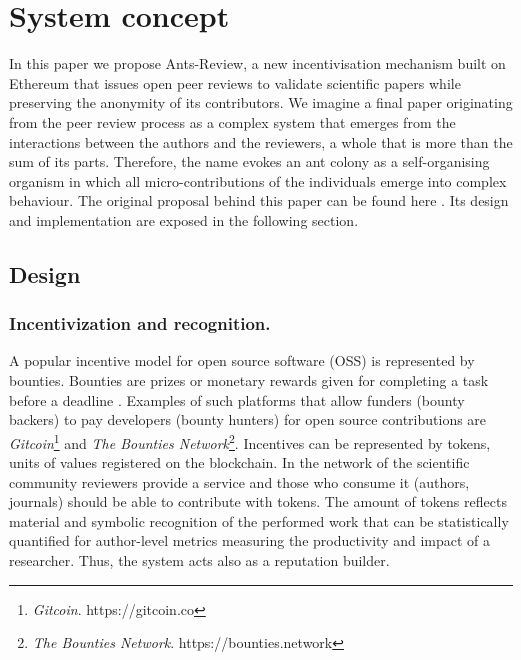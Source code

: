 \documentclass[runningheads]{llncs}
\begin{document}
\section{System concept}
In this paper we propose Ants-Review, a new incentivisation mechanism built on Ethereum that issues open peer reviews to validate scientific papers while preserving the anonymity of its contributors. We imagine a final paper originating from the peer review process as a complex system that emerges from the interactions between the authors and the reviewers, a whole that is more than the sum of its parts. Therefore, the name evokes an ant colony as a self-organising organism in which all micro-contributions of the individuals emerge into complex behaviour. The original proposal behind this paper can be found here \cite{AntsReview}. Its design and implementation are exposed in the following section.

\subsection{Design}

\subsubsection{Incentivization and recognition.} A popular incentive model for open source software (OSS) is represented by bounties. Bounties are prizes or monetary rewards given for completing a task before a deadline \cite{BountyGit}. Examples of such platforms that allow funders (bounty backers) to pay developers (bounty hunters) for open source contributions are \emph{Gitcoin}\footnote[2]{\emph{Gitcoin}. https://gitcoin.co} and \emph{The Bounties Network}\footnote[3]{\emph{The Bounties Network}. https://bounties.network}. Incentives can be represented by tokens, units of values registered on the blockchain. In the network of the scientific community reviewers provide a service and those who consume it (authors, journals) should be able to contribute with tokens. The amount of tokens reflects material and symbolic recognition of the performed work that can be statistically quantified for author-level metrics measuring the productivity and impact of a researcher. Thus, the system acts also as a reputation builder.
\end{document}
